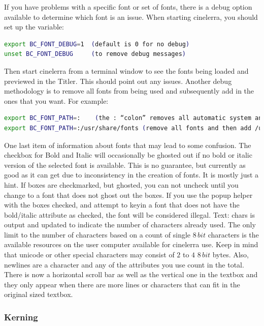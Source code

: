 If you have problems with a specific font or set of fonts, there is a debug option available to determine which font is an issue. When starting cinelerra, you should set up the variable:

\vspace{1ex}
\begin{lstlisting}[language=bash]
export BC_FONT_DEBUG=1	(default is 0 for no debug)
unset BC_FONT_DEBUG		(to remove debug messages)
\end{lstlisting}

Then start cinelerra from a terminal window to see the fonts being loaded and previewed in the Titler. This should point out any issues. Another debug methodology is to remove all fonts from being used and subsequently add in the ones that you want. For example:

\vspace{1ex}
\begin{lstlisting}[language=bash]
export BC_FONT_PATH=:	 (the : “colon” removes all automatic system and cinelerra fonts)
export BC_FONT_PATH=:/usr/share/fonts (remove all fonts and then add /usr/shar/fonts)
\end{lstlisting}

One last item of information about fonts that may lead to some confusion. The checkbox for Bold and Italic will occasionally be ghosted out if no bold or italic version of the selected font is available. This is no guarantee, but currently as good as it can get due to inconsistency in the creation of fonts. It is mostly just a hint. If boxes are checkmarked, but ghosted, you can not uncheck until you change to a font that does not ghost out the boxes. If you use the popup helper with the boxes checked, and attempt to keyin a font that does not have the bold/italic attribute as checked, the font will be considered illegal.
Text: chars is output and updated to indicate the number of characters already used. The only limit to the number of characters based on a count of single $8\, bit$ characters is the available resources on the user computer available for cinelerra use. Keep in mind that unicode or other special characters may consist of $2$ to $4$ $8\,bit$ bytes. Also, newlines are a character and any of the attributes you use count in the total. There is now a horizontal scroll bar as well as the vertical one in the textbox and they only appear when there are more lines or characters that can fit in the original sized textbox.

\subsubsection*{Kerning}%
\label{ssub:kerning}


